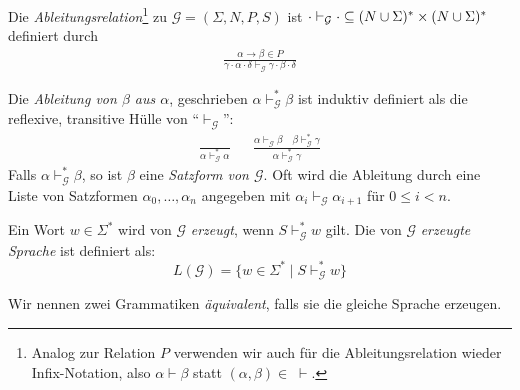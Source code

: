 \begin{Def}
	Die \emph{Ableitungsrelation}\footnote{Analog zur Relation $P$ verwenden wir auch für die Ableitungsrelation wieder Infix-Notation, also $\alpha\vdash\beta$ statt $(\alpha,\beta)\in\;\vdash$.}
	zu $\mathcal{G}=(\Sigma,N,P,S)$ ist 
        $ \cdot \vdash_\mathcal{G} \cdot \subseteq
        (N\cup\Sigma)^*\times(N\cup\Sigma)^* $
        definiert durch
        \begin{gather*}
          \frac{\alpha \to \beta \in P}{\gamma\cdot\alpha\cdot\delta \vdash_\mathcal{G} \gamma\cdot\beta\cdot\delta }
        \end{gather*}
    



  Die \emph{Ableitung von $\beta$ aus $\alpha$}, geschrieben $\alpha
  \vdash^*_\mathcal{G} \beta$ ist induktiv definiert als
  die reflexive, transitive Hülle von "`$\vdash_\mathcal{G}$"':
  \begin{align*}
    \frac{}{\alpha \vdash^*_\mathcal{G} \alpha}
    &
    &
      \frac{{\alpha \vdash_\mathcal{G} \beta} \quad \beta
      \vdash^*_\mathcal{G} \gamma}
      {{\alpha \vdash^*_\mathcal{G} \gamma}}
  \end{align*}
  Falls $\alpha \vdash^*_\mathcal{G} \beta$, so ist $\beta$ eine
  \emph{Satzform von $\mathcal{G}$}. Oft wird die Ableitung durch eine
  Liste von Satzformen $\alpha_0,\ldots,\alpha_n$ angegeben mit
  $\alpha_i \vdash_\mathcal{G} \alpha_{i+1}$ für $0 \le i < n$.
  

  Ein Wort $w\in\Sigma^*$ wird von $\mathcal{G}$ \emph{erzeugt}, wenn $S \vdash^*_{\mathcal{G}} w$ gilt.
	Die von $\mathcal{G}$ \emph{erzeugte Sprache} ist definiert als:
	\[ L(\mathcal{G}) = \{w\in\Sigma^* \mid S \vdash^*_{\mathcal{G}} w \}  \]
	
	Wir nennen zwei Grammatiken \emph{äquivalent}, falls sie die gleiche Sprache erzeugen.
\end{Def}





